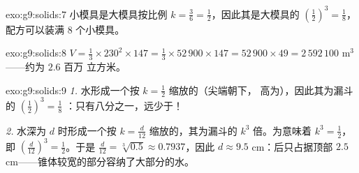\begin{solution}{exo:g9:solids:7}
小模具是大模具按比例 $k = \frac36 =
\frac12$，因此其是大模具的 $\left(\frac12\right)^3 = \frac18$，
配方可以装满 $8$ 个小模具。
\end{solution}

\begin{solution}{exo:g9:solids:8}
$V = \frac13 \times 230^2 \times 147 = \frac13 \times 52\,900 \times 147
= 52\,900 \times 49 = 2\,592\,100$ m$^3$ ——约为 $2.6$ 百万
立方米。
\end{solution}

\begin{solution}{exo:g9:solids:9}
\emph{1.} 水形成一个按 $k = \frac12$ 缩放的（尖端朝下，
高为），因此其为漏斗的 $\left(\frac12\right)^3 = \frac18$
：只有八分之一，远少于！

\emph{2.} 水深为 $d$ 时形成一个按
$k = \frac{d}{12}$ 缩放的，其为漏斗的 $k^3$ 倍。为意味着
$k^3 = \frac12$，即
$\left(\frac{d}{12}\right)^3 = \frac12$。于是
$\frac{d}{12} = \sqrt[3]{0.5} \approx 0.7937$，因此
$d \approx 9.5$ cm：后只占据顶部
$2.5$ cm——锥体较宽的部分容纳了大部分的水。
\end{solution}

